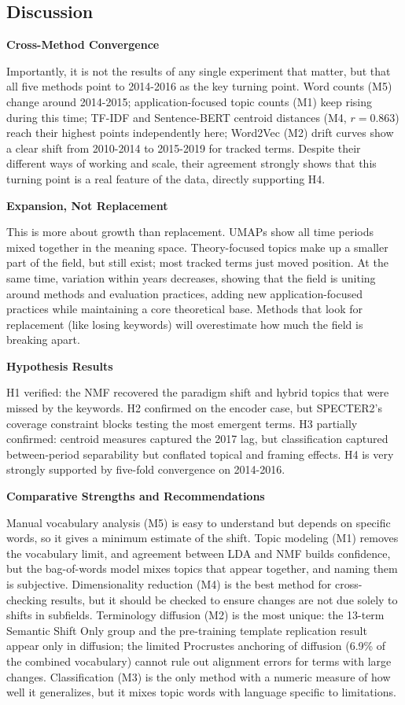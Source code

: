 \subsection{Discussion}

\textbf{Cross-Method Convergence}

Importantly, it is not the results of any single experiment that matter, but that all five methods point to 2014-2016 as the key turning point. Word counts (M5) change around 2014-2015; application-focused topic counts (M1) keep rising during this time; TF-IDF and Sentence-BERT centroid distances (M4, $r = 0.863$) reach their highest points independently here; Word2Vec (M2) drift curves show a clear shift from 2010-2014 to 2015-2019 for tracked terms. Despite their different ways of working and scale, their agreement strongly shows that this turning point is a real feature of the data, directly supporting H4.

\textbf{Expansion, Not Replacement}

This is more about growth than replacement. UMAPs show all time periods mixed together in the meaning space. Theory-focused topics make up a smaller part of the field, but still exist; most tracked terms just moved position. At the same time, variation within years decreases, showing that the field is uniting around methods and evaluation practices, adding new application-focused practices while maintaining a core theoretical base. Methods that look for replacement (like losing keywords) will overestimate how much the field is breaking apart.

\textbf{Hypothesis Results}

H1 verified: the NMF recovered the paradigm shift and hybrid topics that were missed by the keywords. H2 confirmed on the encoder case, but SPECTER2's coverage constraint blocks testing the most emergent terms. H3 partially confirmed: centroid measures captured the 2017 lag, but classification captured between-period separability but conflated topical and framing effects. H4 is very strongly supported by five-fold convergence on 2014-2016. 

\textbf{Comparative Strengths and Recommendations}

Manual vocabulary analysis (M5) is easy to understand but depends on specific words, so it gives a minimum estimate of the shift. Topic modeling (M1) removes the vocabulary limit, and agreement between LDA and NMF builds confidence, but the bag-of-words model mixes topics that appear together, and naming them is subjective. Dimensionality reduction (M4) is the best method for cross-checking results, but it should be checked to ensure changes are not due solely to shifts in subfields. Terminology diffusion (M2) is the most unique: the 13-term Semantic Shift Only group and the pre-training template replication result appear only in diffusion; the limited Procrustes anchoring of diffusion (6.9\% of the combined vocabulary) cannot rule out alignment errors for terms with large changes. Classification (M3) is the only method with a numeric measure of how well it generalizes, but it mixes topic words with language specific to limitations.

